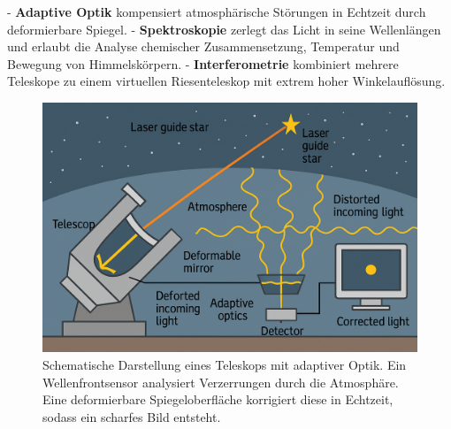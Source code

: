 - \textbf{Adaptive Optik} kompensiert atmosphärische Störungen in Echtzeit durch deformierbare Spiegel.
- \textbf{Spektroskopie} zerlegt das Licht in seine Wellenlängen und erlaubt die Analyse chemischer Zusammensetzung, Temperatur und Bewegung von Himmelskörpern.
- \textbf{Interferometrie} kombiniert mehrere Teleskope zu einem virtuellen Riesenteleskop mit extrem hoher Winkelauflösung.
\begin{figure}[H]
	\centering
	\includegraphics[width=0.9\linewidth]{bilder/Teleskop.png}
	\caption{Schematische Darstellung eines Teleskops mit adaptiver Optik. Ein Wellenfrontsensor analysiert Verzerrungen durch die Atmosphäre. Eine deformierbare Spiegeloberfläche korrigiert diese in Echtzeit, sodass ein scharfes Bild entsteht.}
	\label{fig:adaptive_optik}
\end{figure}


